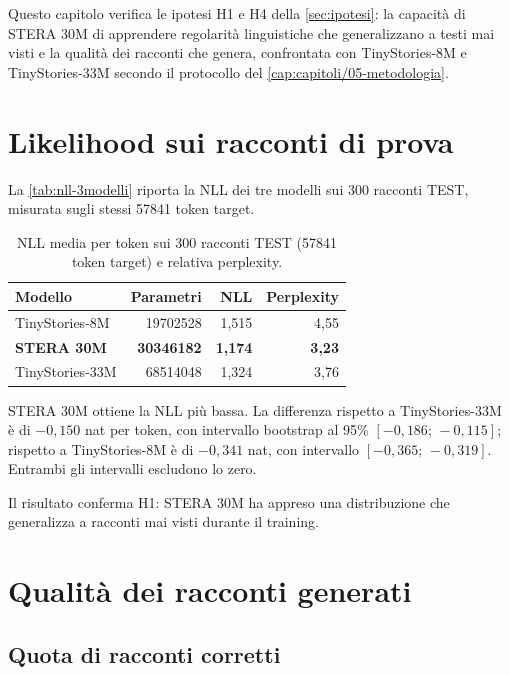 Questo capitolo verifica le ipotesi H1 e H4 della \autoref{sec:ipotesi}: la capacità di STERA 30M di apprendere regolarità linguistiche che generalizzano a testi mai visti e la qualità dei racconti che genera, confrontata con TinyStories-8M e TinyStories-33M secondo il protocollo del \autoref{cap:capitoli/05-metodologia}.



\section{Likelihood sui racconti di prova}
\label{sec:risultati-nll}

La \autoref{tab:nll-3modelli} riporta la NLL dei tre modelli sui 300 racconti TEST, misurata sugli stessi \num{57841} token target.

\begin{table}[htbp]
\centering
\small
\begin{tabular}{lrrr}
\toprule
Modello & Parametri & NLL & Perplexity \\
\midrule
TinyStories-8M & \num{19702528} & 1,515 & 4,55 \\
\textbf{STERA 30M} & \textbf{\num{30346182}} & \textbf{1,174} & \textbf{3,23} \\
TinyStories-33M & \num{68514048} & 1,324 & 3,76 \\
\bottomrule
\end{tabular}
\caption{NLL media per token sui 300 racconti TEST (\num{57841} token target) e relativa perplexity.}
\label{tab:nll-3modelli}
\end{table}

STERA 30M ottiene la NLL più bassa. La differenza rispetto a TinyStories-33M è di $-0{,}150$ nat per token, con intervallo bootstrap al 95\% $[-0{,}186;\,-0{,}115]$; rispetto a TinyStories-8M è di $-0{,}341$ nat, con intervallo $[-0{,}365;\,-0{,}319]$. Entrambi gli intervalli escludono lo zero.

Il risultato conferma H1: STERA 30M ha appreso una distribuzione che generalizza a racconti mai visti durante il training.

\section{Qualità dei racconti generati}
\label{sec:risultati-stera30m-tinystories}

\subsection{Quota di racconti corretti}

